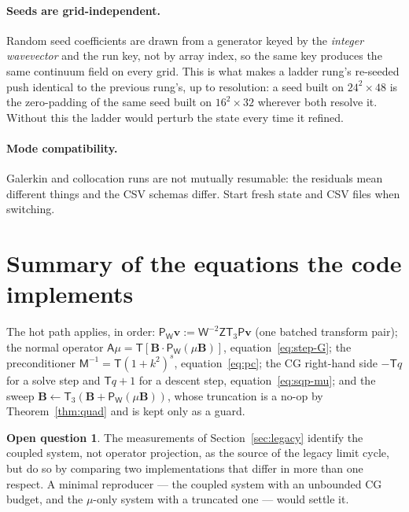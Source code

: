 \documentclass[11pt]{article}
\theoremstyle{definition}
\newtheorem{question}[theorem]{Open question}
\newcommand{\B}{\mathbf{B}}
\newcommand{\vv}{\mathbf{v}}
\newcommand{\Tr}{\mathsf{T}}
\newcommand{\Trr}{\mathsf{T}_3}
\newcommand{\Pl}{\mathsf{P}}
\newcommand{\Wm}{\mathsf{W}}
\newcommand{\Zf}{\mathsf{Z}}
\newcommand{\Aop}{\mathsf{A}}
\newcommand{\Minv}{\mathsf{M}^{-1}}
\begin{document}
\paragraph{Seeds are grid-independent.} Random seed coefficients are drawn
from a generator keyed by the \emph{integer wavevector} and the run key, not
by array index, so the same key produces the same continuum field on every
grid. This is what makes a ladder rung's re-seeded push identical to the
previous rung's, up to resolution: a seed built on $24^2\times48$ is the
zero-padding of the same seed built on $16^2\times32$ wherever both resolve
it. Without this the ladder would perturb the state every time it refined.

\paragraph{Mode compatibility.} Galerkin and collocation runs are not mutually
resumable: the residuals mean different things and the CSV schemas differ.
Start fresh state and CSV files when switching.

\section*{Summary of the equations the code implements}

The hot path applies, in order: $\Pl_\Wm\vv:=\Wm^{-2}\Zf\Trr\Pl\vv$ (one
batched transform pair); the normal operator
$\Aop\mu=\Tr[\B\cdot\Pl_\Wm(\mu\B)]$, equation~\eqref{eq:step-G}; the
preconditioner $\Minv=\Tr(1+k^2)^{s}$, equation~\eqref{eq:pc}; the CG
right-hand side $-\Tr q$ for a solve step and $\Tr q+1$ for a descent step,
equation~\eqref{eq:sqp-mu}; and the sweep
$\B\leftarrow\Trr(\B+\Pl_\Wm(\mu\B))$, whose truncation is a no-op by
Theorem~\ref{thm:quad} and is kept only as a guard.

\begin{question}
The measurements of Section~\ref{sec:legacy} identify the coupled system, not
operator projection, as the source of the legacy limit cycle, but do so by
comparing two implementations that differ in more than one respect. A minimal
reproducer --- the coupled system with an unbounded CG budget, and the
$\mu$-only system with a truncated one --- would settle it.
\end{question}
\end{document}
